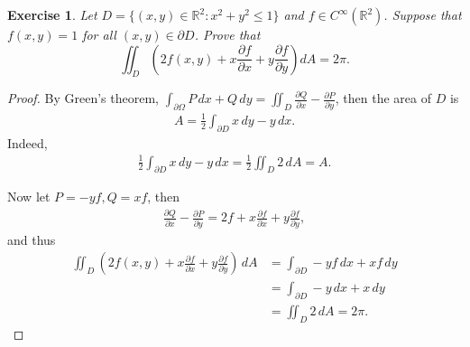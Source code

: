 \documentclass[11pt]{article}
\newtheorem{exercise}{Exercise}[section]
\theoremstyle{definition}
\numberwithin{equation}{subsection}
\begin{document}
\begin{exercise}
Let $D =\{(x, y)\in\mathbb{R}^2 : x^2 + y^2\leq 1\}$ and $f\in C^\infty(\mathbb{R}^2)$. Suppose that $f(x, y) = 1$ for all
$(x, y)\in\partial D$. Prove that
$$
\iint_D \left(2f(x,y)+x\frac{\partial f}{\partial x}+y\frac{\partial f}{\partial y}\right)dA=2\pi.
$$
\end{exercise}
\begin{proof}
By Green's theorem, $\int_{\partial \Omega} P\, dx + Q\, dy = \iint_D \frac{\partial Q}{\partial x} - \frac{\partial P}{\partial y}$, then the area of $D$ is 
\begin{align*}
    A = \frac{1}{2} \int_{\partial D} x\, dy - y\, dx.
\end{align*}
Indeed, 
\begin{align*}
    \frac{1}{2} \int_{\partial D} x\, dy - y\, dx = \frac{1}{2} \iint_D 2\, dA = A.
\end{align*}

Now let $P = -yf, Q = xf$, then 
\begin{align*}
    \frac{\partial Q}{\partial x} - \frac{\partial P}{\partial y} = 2f + x \frac{\partial f}{\partial x} + y \frac{\partial f}{\partial y},
\end{align*}
and thus
\begin{align*}
    \iint_D \left(2f(x,y)+x\frac{\partial f}{\partial x}+y\frac{\partial f}{\partial y}\right)\, dA & = \int_{\partial D} -yf\, dx + x f\, dy \\
    & = \int_{\partial D} -y \, dx + x \, dy \\
    & = \iint_D 2\, dA = 2\pi.
\end{align*}
\end{proof}








\newpage


\end{document}
